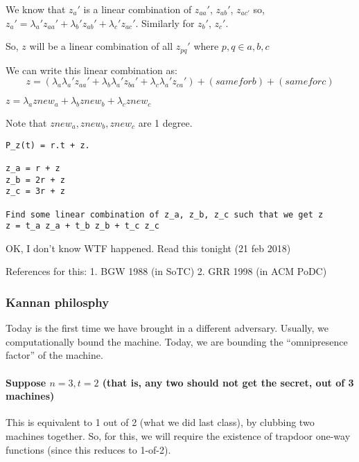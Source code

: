 We know that $z_a'$ is a linear combination of $z_{aa}'$, $z_{ab}'$, $z_{ac'}$
so, $z_a' = \lambda_a' z_{aa}' + \lambda_b' z_{ab}' + \lambda_c' z_{ac}'$.
Similarly for $z_b'$, $z_c'$.


So, $z$ will be a linear combination of all $z_{pq}'$ where $p, q \in {a, b, c}$

We can write this linear combination as:
$$z = (\lambda_a \lambda_a' z_{aa}' +
     \lambda_b \lambda_a' z_{ba}' +
     \lambda_c \lambda_a' z_{ca}') +
     (same for b) +
     (same for c)$$

$z = \lambda_a znew_a + \lambda_b znew_b + \lambda_c znew_c$

Note that $znew_a, znew_b, znew_c$ are 1 degree.



\begin{verbatim}
P_z(t) = r.t + z.

z_a = r + z
z_b = 2r + z
z_c = 3r + z

Find some linear combination of z_a, z_b, z_c such that we get z
z = t_a z_a + t_b z_b + t_c z_c
\end{verbatim}

OK, I don't know WTF happened. Read this tonight (21 feb 2018)



References for this:
1. BGW 1988 (in SoTC)
2. GRR 1998 (in ACM PoDC)

\subsubsection{Kannan philosphy}
Today is the first time we have brought in a different adversary. Usually, we computationally bound the machine.
Today, we are bounding the ``omnipresence factor'' of the machine.


\paragraph{Suppose $n = 3, t = 2$ (that is, any two should not get the secret, out of 3 machines)}
This is equivalent to 1 out of 2 (what we did last class), by clubbing two machines together.
So, for this, we will require the existence of trapdoor one-way functions (since this reduces to 1-of-2).


